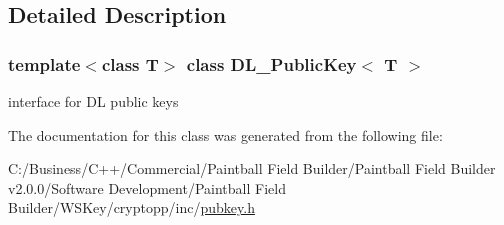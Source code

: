 \subsection{Detailed Description}
\subsubsection*{template$<$class T$>$ class DL\_\-PublicKey$<$ T $>$}

interface for DL public keys 

The documentation for this class was generated from the following file:\begin{DoxyCompactItemize}
\item 
C:/Business/C++/Commercial/Paintball Field Builder/Paintball Field Builder v2.0.0/Software Development/Paintball Field Builder/WSKey/cryptopp/inc/\hyperlink{pubkey_8h}{pubkey.h}\end{DoxyCompactItemize}
